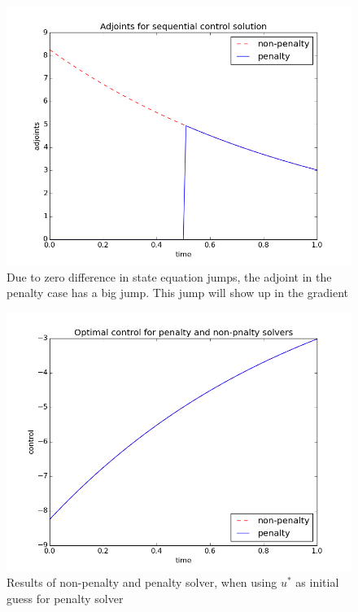 \documentclass[11pt,a4paper]{report}
\begin{document}
\begin{figure}
  \includegraphics[width=\linewidth]{adjoint.png}
  \caption{Due to zero difference in state equation jumps, the adjoint in the penalty case has a big jump. This jump will show up in the gradient}
  \label{Fig 1}
\end{figure}
\begin{figure}
  \includegraphics[width=\linewidth]{control.png}
  \caption{Results of non-penalty and penalty solver, when using $u^*$ as initial guess for penalty solver}
  \label{Fig 2}
\end{figure}
\end{document}
